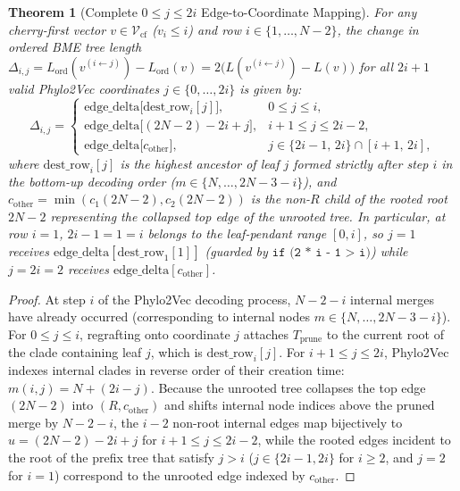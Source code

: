\documentclass[11pt,a4paper]{article}
\newtheorem{theorem}{Theorem}[section]
\theoremstyle{definition}
\begin{document}
\begin{theorem}[Complete $0 \le j \le 2i$ Edge-to-Coordinate Mapping]
\label{thm:full_2i}
For any cherry-first vector $v \in \mathcal{V}_{\text{cf}}$ ($v_i \le i$) and row $i \in \{1, \dots, N-2\}$, the change in ordered BME tree length $\Delta_{i, j} = L_{\text{ord}}(v^{(i \leftarrow j)}) - L_{\text{ord}}(v) = 2\big(L(v^{(i \leftarrow j)}) - L(v)\big)$ for all $2i+1$ valid Phylo2Vec coordinates $j \in \{0, \dots, 2i\}$ is given by:
\begin{equation}
\Delta_{i, j} = \begin{cases}
\text{edge\_delta}\big[\text{dest\_row}_i[j]\big], & 0 \le j \le i, \\[4pt]
\text{edge\_delta}\big[(2N - 2) - 2i + j\big], & i + 1 \le j \le 2i - 2, \\[4pt]
\text{edge\_delta}\big[c_{\text{other}}\big], & j \in \{2i - 1, \, 2i\} \cap [i + 1, \, 2i],
\end{cases}
\label{eq:full_mapping}
\end{equation}
where $\text{dest\_row}_i[j]$ is the highest ancestor of leaf $j$ formed strictly after step $i$ in the bottom-up decoding order ($m \in \{N, \dots, 2N - 3 - i\}$), and $c_{\text{other}} = \min(c_1(2N-2), c_2(2N-2))$ is the non-$R$ child of the rooted root $2N-2$ representing the collapsed top edge of the unrooted tree. In particular, at row $i = 1$, $2i - 1 = 1 = i$ belongs to the leaf-pendant range $[0, i]$, so $j = 1$ receives $\text{edge\_delta}[\text{dest\_row}_1[1]]$ (guarded by $\texttt{if (2 * i - 1 > i)}$) while $j = 2i = 2$ receives $\text{edge\_delta}[c_{\text{other}}]$.
\end{theorem}
\begin{proof}
At step $i$ of the Phylo2Vec decoding process, $N - 2 - i$ internal merges have already occurred (corresponding to internal nodes $m \in \{N, \dots, 2N - 3 - i\}$). For $0 \le j \le i$, regrafting onto coordinate $j$ attaches $T_{\text{prune}}$ to the current root of the clade containing leaf $j$, which is $\text{dest\_row}_i[j]$. For $i+1 \le j \le 2i$, Phylo2Vec indexes internal clades in reverse order of their creation time: $m(i, j) = N + (2i - j)$. Because the unrooted tree collapses the top edge $(2N-2)$ into $(R, c_{\text{other}})$ and shifts internal node indices above the pruned merge by $N - 2 - i$, the $i - 2$ non-root internal edges map bijectively to $u = (2N-2) - 2i + j$ for $i+1 \le j \le 2i-2$, while the rooted edges incident to the root of the prefix tree that satisfy $j > i$ ($j \in \{2i-1, 2i\}$ for $i \ge 2$, and $j = 2$ for $i = 1$) correspond to the unrooted edge indexed by $c_{\text{other}}$.
\end{proof}
\end{document}
